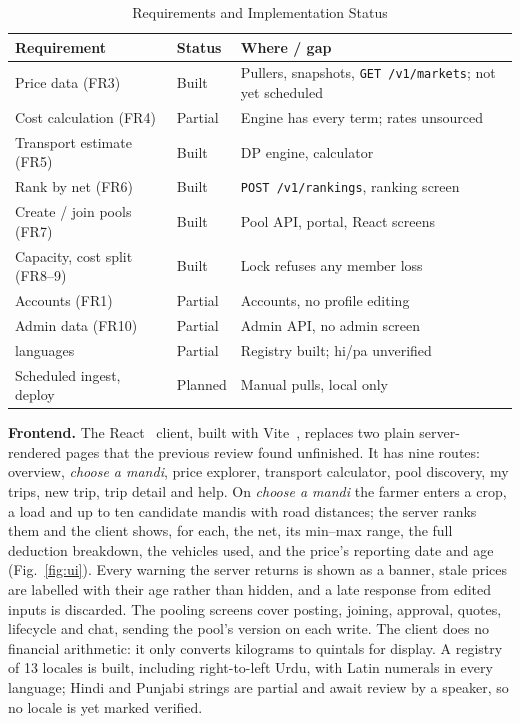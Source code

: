 \documentclass[conference]{IEEEtran}
\begin{document}
\begin{table}[!t]
\caption{Requirements and Implementation Status}
\label{tab:status}
\centering
\scriptsize
\setlength{\tabcolsep}{3pt}
\begin{tabular}{>{\raggedright\arraybackslash}p{}
    >{\raggedright\arraybackslash}p{}
    >{\raggedright\arraybackslash}p{}}
\toprule
\textbf{Requirement} & \textbf{Status} & \textbf{Where / gap}\\
\midrule
Price data (FR3) & Built & Pullers, snapshots, \texttt{GET /v1/markets}; not yet scheduled\\
Cost calculation (FR4) & Partial & Engine has every term; rates unsourced\\
Transport estimate (FR5) & Built & DP engine, calculator\\
Rank by net (FR6) & Built & \texttt{POST /v1/rankings}, ranking screen\\
Create / join pools (FR7) & Built & Pool API, portal, React screens\\
Capacity, cost split (FR8--9) & Built & Lock refuses any member loss\\
Accounts (FR1) & Partial & Accounts, no profile editing\\
Admin data (FR10) & Partial & Admin API, no admin screen\\
13 languages & Partial & Registry built; hi/pa unverified\\
Scheduled ingest, deploy & Planned & Manual pulls, local only\\
\bottomrule
\end{tabular}
\end{table}

\textbf{Frontend.} The React~\cite{react} client, built with
Vite~\cite{vite}, replaces two plain server-rendered pages that the
previous review found unfinished. It has nine routes: overview,
\emph{choose a mandi}, price explorer, transport calculator, pool
discovery, my trips, new trip, trip detail and help. On \emph{choose a
mandi} the farmer enters a crop, a load and up to ten candidate mandis
with road distances; the server ranks them and the client shows, for
each, the net, its min--max range, the full deduction breakdown, the
vehicles used, and the price's reporting date and age
(Fig.~\ref{fig:ui}). Every warning the server returns is shown as a
banner, stale prices are labelled with their age rather than hidden, and
a late response from edited inputs is discarded. The pooling screens
cover posting, joining, approval, quotes, lifecycle and chat, sending the
pool's version on each write. The client does no financial arithmetic: it
only converts kilograms to quintals for display. A registry of 13
locales is built, including right-to-left Urdu, with Latin numerals in
every language; Hindi and Punjabi strings are partial and await review by
a speaker, so no locale is yet marked verified.
\end{document}
